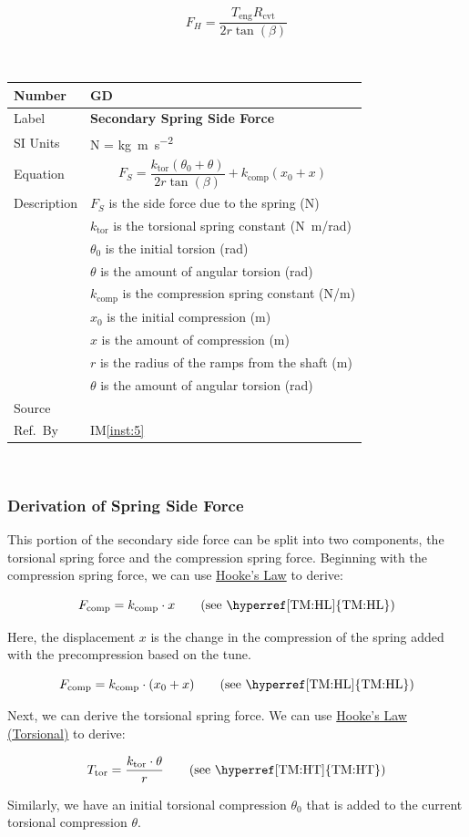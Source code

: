 \documentclass[12pt]{article}
\newcommand{\colAwidth}{0.13\textwidth}
\newcommand{\colBwidth}{0.82\textwidth}
\newcounter{defnum} %
\newcommand{\iref}[1]{IM\ref{#1}}
\newcommand{\defgeneral}[6] {
~\newline
\noindent
\begin{minipage}{\textwidth}
\renewcommand*{\arraystretch}{1.5}
\begin{tabular}{| p{\colAwidth} | p{\colBwidth}|}
  \hline
  \rowcolor[gray]{0.9}
  Number& GD\refstepcounter{defnum}\thedefnum \label{GD_\thedefnum}\\
  \hline
  Label& \bf #1 \\
  \hline
  SI Units& #2\\
  \hline
  Equation& #3\\
  \hline
  Description& #4 \\
  \hline
  Source& #5 \\
  \hline
  Ref.\ By & #6\\
  \hline
\end{tabular}
\end{minipage}\\
}
\begin{document}
\[ F_H = \frac{T_\text{eng} R_\text{cvt}}{2r\tan(\beta)} \]


\defgeneral
{Secondary Spring Side Force} %
{N = \si{\kilogram \metre\per\square\second}} %
{\[F_S = \frac{k_{\text{tor}}(\theta_0 + \theta)}{2r\tan(\beta)} + k_\text{comp}(x_0 + x)\]} %
{$F_S$ is the side force due to the spring (N) \\
& $k_{\text{tor}}$ is the torsional spring constant (\si[per-mode=symbol] {\newton\metre\per\radian}) \\
& $\theta_0$ is the initial torsion (rad) \\
& $\theta$ is the amount of angular torsion (rad) \\
& $k_{\text{comp}}$ is the compression spring constant (\si[per-mode=symbol] {\newton\per\metre}) \\
& $x_0$ is the initial compression (m) \\
& $x$ is the amount of compression (m) \\
& $r$ is the radius of the ramps from the shaft (m) \\
& $\theta$ is the amount of angular torsion (rad)} %
{} %
{\iref{inst:5}} %

\subsubsection*{Derivation of Spring Side Force}

This portion of the secondary side force can be split into two components, the torsional spring force and the compression spring force. 
Beginning with the compression spring force, we can use \hyperref[TM:HL]{Hooke's Law} to derive:

\[ F_{\text{comp}} = k_{\text{comp}} \cdot x \tag*{\text{(see \hyperref[TM:HL]{TM:HL})}}\]

Here, the displacement $x$ is the change in the compression of the spring added with the precompression based on the tune.

\[ F_{\text{comp}} = k_{\text{comp}} \cdot (x_0 + x) \tag*{\text{(see \hyperref[TM:HL]{TM:HL})}}\]

Next, we can derive the torsional spring force. We can use \hyperref[TM:HT]{Hooke's Law (Torsional)} to derive:

\[ T_{\text{tor}} = \frac{k_{\text{tor}} \cdot \theta}{r} \tag*{\text{(see \hyperref[TM:HT]{TM:HT})}}\]

Similarly, we have an initial torsional compression $\theta_0$ that is added to the current torsional compression $\theta$.
\end{document}
